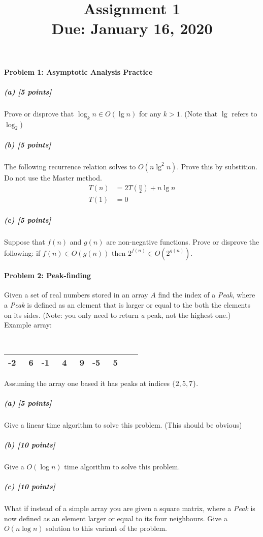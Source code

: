 \documentclass[11pt]{article}
\title{\bf Assignment 1 \\[2ex]
\rm\normalsize Due: January 16, 2020}
\date{}
\author{}
\begin{document}
\maketitle

\begin{center}
\end{center}

\paragraph{Problem 1: Asymptotic Analysis Practice}
\subparagraph{(a) [5 points]}
Prove or disprove that $\log_k n \in O(\lg n)$ for any $k > 1$. (Note that $\lg$ refers to $\log_2$)
\subparagraph{(b) [5 points]}
The following recurrence relation solves to $O(n \lg^2 n)$. Prove this by substition. Do not use the Master method.
\begin{align*}
T(n) &= 2T\left( \frac n2 \right) + n \lg n \\
T(1) &= 0
\end{align*}
\subparagraph{(c) [5 points]}
Suppose that $f(n)$ and $g(n)$ are non-negative functions. Prove or disprove the following: if $f(n) \in O(g(n))$ then $2^{f(n)} \in O(2^{g(n)})$.


\paragraph{Problem 2: Peak-finding}
Given a set of real numbers stored in an array $A$ find the index of a {\em Peak}, where a {\em Peak} is defined as an
element that is larger or equal to the both the elements on its sides. (Note: you only need to return {\em a} peak, not
the highest one.)\\

Example array:
                {\tt
                \begin{tabular}{|*{9}{r|}}
                    \hline
                    -2 & \ 6 & -1 & \ 4 & \ 9 & -5 & \ 5  \\
                    \hline
                \end{tabular}
                }

Assuming the array one based it has peaks at indices $\{2,5,7 \}$.

\subparagraph{(a) [5 points]}
Give a linear time algorithm to solve this problem. (This should be obvious)
\subparagraph{(b) [10 points]}
Give a $O(\log n)$ time algorithm to solve this problem.
\subparagraph{(c) [10 points]}
What if instead of a simple array you are given a square matrix, where a {\em Peak} is now defined as an element larger
or equal to its four neighbours. Give a $O(n \log n)$ solution to this variant of the problem.
\end{document}
